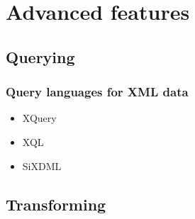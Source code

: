 

\section{Advanced features}




\subsection*{Querying}





\frame
{
	\frametitle{Query languages for XML data}
	
	\begin{itemize}
	
		\item XQuery
		
		\item XQL
		
		\item SiXDML
	
	\end{itemize}
}

\usebackgroundtemplate{}




\subsection*{Transforming}





